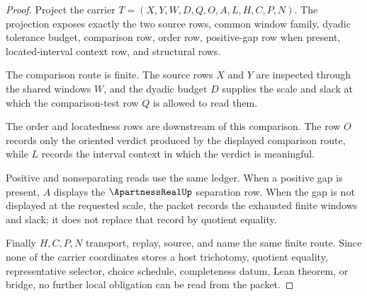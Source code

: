 \begin{proof}
Project the carrier $T=(X,Y,W,D,Q,O,A,L,H,C,P,N)$. The projection exposes exactly the two source rows, common window family, dyadic tolerance budget, comparison row, order row, positive-gap row when present, located-interval context row, and structural rows.

The comparison route is finite. The source rows $X$ and $Y$ are inspected through the shared windows $W$, and the dyadic budget $D$ supplies the scale and slack at which the comparison-test row $Q$ is allowed to read them.

The order and locatedness rows are downstream of this comparison. The row $O$ records only the oriented verdict produced by the displayed comparison route, while $L$ records the interval context in which the verdict is meaningful.

Positive and nonseparating reads use the same ledger. When a positive gap is present, $A$ displays the $\ApartnessRealUp$ separation row. When the gap is not displayed at the requested scale, the packet records the exhausted finite windows and slack; it does not replace that record by quotient equality.

Finally $H,C,P,N$ transport, replay, source, and name the same finite route. Since none of the carrier coordinates stores a host trichotomy, quotient equality, representative selector, choice schedule, completeness datum, Lean theorem, or bridge, no further local obligation can be read from the packet.
\end{proof}


